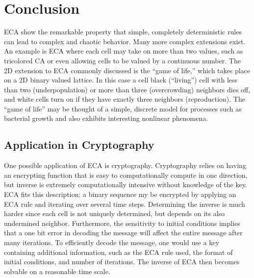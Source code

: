\section{Conclusion}

ECA show the remarkable property that simple, completely deterministic rules can lead to complex and chaotic behavior.  Many more complex extensions exist.  An example is ECA where each cell may take on more than two values, such as tricolored CA or even allowing cells to be valued by a continuous number.  The 2D extension to ECA commonly discussed is the “game of life,” which takes place on a 2D binary valued lattice.  In this case a cell black (“living”) cell with less than two (underpopulation) or more than three (overcrowding) neighbors dies off, and white cells turn on if they have exactly three neighbors (reproduction).  The “game of life” may be thought of a simple, discrete model for processes such as bacterial growth and also exhibits interesting nonlinear phenomena.  

\subsection{Application in Cryptography}

One possible application of ECA is cryptography.  Cryptography relies on having an encrypting function that is easy to computationally compute in one direction, but inverse is extremely computationally intensive without knowledge of the key.  ECA fits this description: a binary sequence my be encrypted by applying an ECA rule and iterating over several time steps.  Determining the inverse is much harder since each cell is not uniquely determined, but depends on its also undermined neighbor.  Furthermore, the sensitivity to initial conditions implies that a one bit error in decoding the message will affect the entire message after many iterations.  To efficiently decode the message, one would use a key containing additional information, such as the ECA rule used, the format of initial conditions, and number of iterations.  The inverse of ECA then becomes solvable on a reasonable time scale.  


